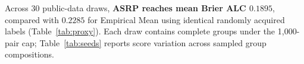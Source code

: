 Across 30 public-data draws, \textbf{ASRP reaches mean Brier ALC $0.1895$}, compared with $0.2285$ for Empirical Mean using identical randomly acquired labels (Table~\ref{tab:proxy}). Each draw contains complete groups under the 1,000-pair cap; Table~\ref{tab:seeds} reports score variation across sampled group compositions.
